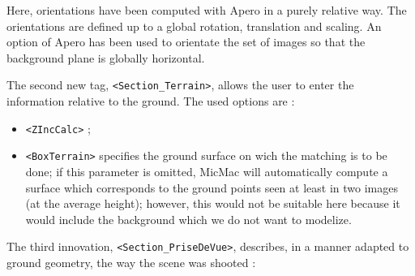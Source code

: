 Here, orientations have been computed with Apero in a purely relative way. The orientations
are defined up to a global rotation, translation and scaling. An option of Apero has been
used to orientate the set of images so that the background plane is globally horizontal.

The second new tag, {\tt <Section\_Terrain>}, allows the user to enter the
information relative to the ground. The used options are :

\begin{itemize}
   \item  {\tt <ZIncCalc>} ;

   \item  {\tt <BoxTerrain>}  specifies the ground surface on wich the matching is to be done;
          if  this  parameter is omitted, MicMac will automatically compute a surface which corresponds
          to the ground points seen at least in
          two images (at the average height); however, this would not be suitable
          here because it would include the background which we do not want to modelize.

\end{itemize}


The third innovation, {\tt <Section\_PriseDeVue>}, describes, in a manner adapted to ground geometry,
the way the scene was shooted :


